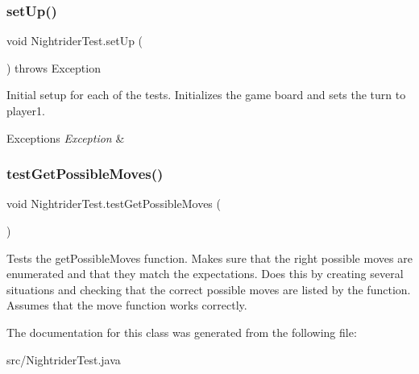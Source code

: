 \subsubsection{\texorpdfstring{set\+Up()}{setUp()}}
{\footnotesize\ttfamily void Nightrider\+Test.\+set\+Up (\begin{DoxyParamCaption}{ }\end{DoxyParamCaption}) throws Exception}

Initial setup for each of the tests. Initializes the game board and sets the turn to player1. 
\begin{DoxyExceptions}{Exceptions}
{\em Exception} & \\
\hline
\end{DoxyExceptions}
\mbox{\label{class_nightrider_test_ae731ba66c3dcd5f17641cab9f6838d1f}} 
\subsubsection{\texorpdfstring{test\+Get\+Possible\+Moves()}{testGetPossibleMoves()}}
{\footnotesize\ttfamily void Nightrider\+Test.\+test\+Get\+Possible\+Moves (\begin{DoxyParamCaption}{ }\end{DoxyParamCaption})}

Tests the get\+Possible\+Moves function. Makes sure that the right possible moves are enumerated and that they match the expectations. Does this by creating several situations and checking that the correct possible moves are listed by the function. Assumes that the move function works correctly. 

The documentation for this class was generated from the following file\+:\begin{DoxyCompactItemize}
\item 
src/Nightrider\+Test.\+java\end{DoxyCompactItemize}
